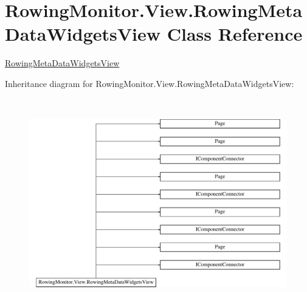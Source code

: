 \hypertarget{class_rowing_monitor_1_1_view_1_1_rowing_meta_data_widgets_view}{}\section{Rowing\+Monitor.\+View.\+Rowing\+Meta\+Data\+Widgets\+View Class Reference}
\label{class_rowing_monitor_1_1_view_1_1_rowing_meta_data_widgets_view}


\hyperlink{class_rowing_monitor_1_1_view_1_1_rowing_meta_data_widgets_view}{Rowing\+Meta\+Data\+Widgets\+View}  


Inheritance diagram for Rowing\+Monitor.\+View.\+Rowing\+Meta\+Data\+Widgets\+View\+:\begin{figure}[H]
\begin{center}
\leavevmode
\includegraphics[height=9.120521cm]{class_rowing_monitor_1_1_view_1_1_rowing_meta_data_widgets_view}
\end{center}
\end{figure}
